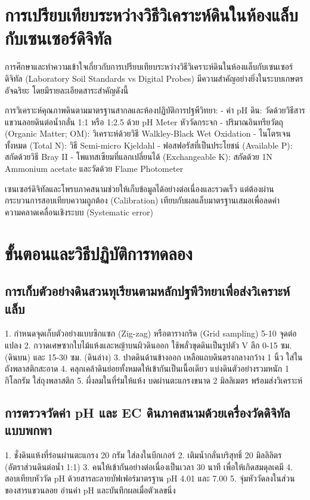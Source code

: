 \section{การเปรียบเทียบระหว่างวิธีวิเคราะห์ดินในห้องแล็บกับเซนเซอร์ดิจิทัล}

การศึกษาและทำความเข้าใจเกี่ยวกับการเปรียบเทียบระหว่างวิธีวิเคราะห์ดินในห้องแล็บกับเซนเซอร์ดิจิทัล (Laboratory Soil Standards vs Digital Probes) มีความสำคัญอย่างยิ่งในระบบเกษตรอัจฉริยะ โดยมีรายละเอียดสาระสำคัญดังนี้

การวิเคราะห์คุณภาพดินตามมาตรฐานสากลและห้องปฏิบัติการปฐพีวิทยา:
- ค่า pH ดิน: วัดด้วยวิธีสารแขวนลอยดินต่อน้ำกลั่น 1:1 หรือ 1:2.5 ด้วย pH Meter หัววัดกระจก
- ปริมาณอินทรียวัตถุ (Organic Matter; OM): วิเคราะห์ด้วยวิธี Walkley-Black Wet Oxidation
- ไนโตรเจนทั้งหมด (Total N): วิธี Semi-micro Kjeldahl
- ฟอสฟอรัสที่เป็นประโยชน์ (Available P): สกัดด้วยวิธี Bray II
- โพแทสเซียมที่แลกเปลี่ยนได้ (Exchangeable K): สกัดด้วย 1N Ammonium acetate และวัดด้วย Flame Photometer

เซนเซอร์ดิจิทัลและโพรบภาคสนามช่วยให้เก็บข้อมูลได้อย่างต่อเนื่องและรวดเร็ว แต่ต้องผ่านกระบวนการสอบเทียบความถูกต้อง (Calibration) เทียบกับผลแล็บมาตรฐานเสมอเพื่อลดค่าความคลาดเคลื่อนเชิงระบบ (Systematic error)

\section{ขั้นตอนและวิธีปฏิบัติการทดลอง}

\subsection{การเก็บตัวอย่างดินสวนทุเรียนตามหลักปฐพีวิทยาเพื่อส่งวิเคราะห์แล็บ}
\begin{sensorbox}
1. กำหนดจุดเก็บตัวอย่างแบบซิกแซก (Zig-zag) หรือตารางกริด (Grid sampling) 5-10 จุดต่อแปลง
2. กวาดเศษซากใบไม้แห้งและหญ้าบนผิวดินออก ใช้พลั่วขุดดินเป็นรูปตัว V ลึก 0-15 ซม. (ดินบน) และ 15-30 ซม. (ดินล่าง)
3. ปาดดินด้านข้างออก เหลือแถบดินตรงกลางกว้าง 1 นิ้ว ใส่ในถังพลาสติกสะอาด
4. คลุกเคล้าดินย่อยทั้งหมดให้เข้ากันเป็นเนื้อเดียว แบ่งดินตัวอย่างรวมหนัก 1 กิโลกรัม ใส่ถุงพลาสติก
5. ผึ่งลมในที่ร่มให้แห้ง บดผ่านตะแกรงขนาด 2 มิลลิเมตร พร้อมส่งวิเคราะห์
\end{sensorbox}

\subsection{การตรวจวัดค่า pH และ EC ดินภาคสนามด้วยเครื่องวัดดิจิทัลแบบพกพา}
\begin{sensorbox}
1. ชั่งดินแห้งที่ร่อนผ่านตะแกรง 20 กรัม ใส่ลงในบีกเกอร์
2. เติมน้ำกลั่นบริสุทธิ์ 20 มิลลิลิตร (อัตราส่วนดินต่อน้ำ 1:1)
3. คนให้เข้ากันอย่างต่อเนื่องเป็นเวลา 30 นาที เพื่อให้เกิดสมดุลเคมี
4. สอบเทียบหัววัด pH ด้วยสารละลายบัฟเฟอร์มาตรฐาน pH 4.01 และ 7.00
5. จุ่มหัววัดลงในส่วนของสารแขวนลอย อ่านค่า pH และบันทึกผลเมื่อตัวเลขนิ่ง
\end{sensorbox}

